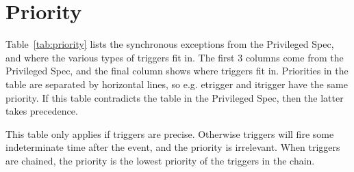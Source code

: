 \section{Priority}

Table~\ref{tab:priority} lists the synchronous exceptions from the Privileged
Spec, and where the various types of triggers fit in. The first 3 columns come
from the Privileged Spec, and the final column shows where triggers fit in.
Priorities in the table are separated by horizontal lines, so e.g. etrigger and
itrigger have the same priority.
If this table contradicts the table in the Privileged Spec, then the latter
takes precedence.

This table only applies if triggers are precise. Otherwise triggers
will fire some indeterminate time after the event, and the priority is
irrelevant.
When triggers are chained, the priority is the lowest priority of the triggers
in the chain.

